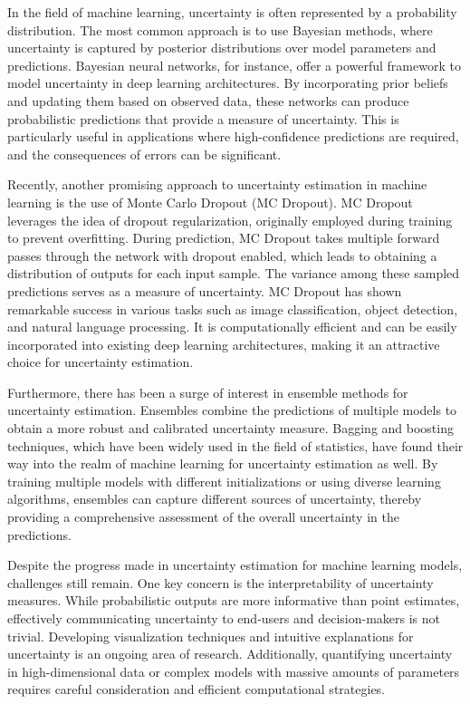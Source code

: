 In the field of machine learning, uncertainty is often represented by a probability distribution. The most common approach is to use Bayesian methods, where uncertainty is captured by posterior distributions over model parameters and predictions. Bayesian neural networks, for instance, offer a powerful framework to model uncertainty in deep learning architectures. By incorporating prior beliefs and updating them based on observed data, these networks can produce probabilistic predictions that provide a measure of uncertainty. This is particularly useful in applications where high-confidence predictions are required, and the consequences of errors can be significant.

Recently, another promising approach to uncertainty estimation in machine learning is the use of Monte Carlo Dropout (MC Dropout). MC Dropout leverages the idea of dropout regularization, originally employed during training to prevent overfitting. During prediction, MC Dropout takes multiple forward passes through the network with dropout enabled, which leads to obtaining a distribution of outputs for each input sample. The variance among these sampled predictions serves as a measure of uncertainty. MC Dropout has shown remarkable success in various tasks such as image classification, object detection, and natural language processing. It is computationally efficient and can be easily incorporated into existing deep learning architectures, making it an attractive choice for uncertainty estimation.

Furthermore, there has been a surge of interest in ensemble methods for uncertainty estimation. Ensembles combine the predictions of multiple models to obtain a more robust and calibrated uncertainty measure. Bagging and boosting techniques, which have been widely used in the field of statistics, have found their way into the realm of machine learning for uncertainty estimation as well. By training multiple models with different initializations or using diverse learning algorithms, ensembles can capture different sources of uncertainty, thereby providing a comprehensive assessment of the overall uncertainty in the predictions.

Despite the progress made in uncertainty estimation for machine learning models, challenges still remain. One key concern is the interpretability of uncertainty measures. While probabilistic outputs are more informative than point estimates, effectively communicating uncertainty to end-users and decision-makers is not trivial. Developing visualization techniques and intuitive explanations for uncertainty is an ongoing area of research. Additionally, quantifying uncertainty in high-dimensional data or complex models with massive amounts of parameters requires careful consideration and efficient computational strategies.

